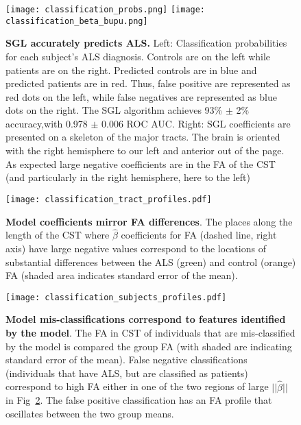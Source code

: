 \begin{figure}[h]
    \centering
    \texttt{[image: classification\_probs.png]}
    \texttt{[image: classification\_beta\_bupu.png]}

    \caption{{\bf SGL accurately predicts ALS.}
        Left: Classification probabilities for each subject's ALS diagnosis.
        Controls are on the left while patients are on the right. Predicted
        controls are in blue and predicted patients are in red. Thus, false
        positive are represented as red dots on the left, while false negatives
        are represented as blue dots on the right. The SGL algorithm achieves
        93\% $\pm$ 2\% accuracy,with 0.978 $\pm$ 0.006 ROC AUC. Right: SGL
        coefficients are presented on a skeleton of the major tracts. The brain
        is oriented with the right hemisphere to our left and anterior out of
        the page. As expected large negative coefficients are in the FA of the
        CST (and particularly in the right hemisphere, here to the left)}
    \label{fig:class-results}
\end{figure}

\begin{figure}[h]
    \centering
    \texttt{[image: classification\_tract\_profiles.pdf]}
    \caption{{\bf Model coefficients mirror FA differences}. The places along the
       length of the CST  where $\hat{\beta}$ coefficients for FA
       (dashed line, right axis) have large negative values correspond to the
       locations of substantial differences between the ALS (green) and control
       (orange) FA (shaded area indicates standard error of the mean).}
    \label{fig:class-profiles}
\end{figure}

\begin{figure}[h]
    \centering
        \texttt{[image: classification\_subjects\_profiles.pdf]}
    \caption{{\bf Model mis-classifications correspond to features identified by
       the model}. The FA in CST of individuals that are mis-classified by the
       model is compared the group FA (with shaded are indicating standard error
       of the mean). False negative classifications (individuals that have ALS,
       but are classified as patients) correspond to high FA either in one of
       the two regions of large $||\hat{\beta}||$ in
       Fig~\ref{fig:class-profiles}. The false positive classification has
       an FA profile that oscillates between the two group means.
   }
    \label{fig:class-errors}
\end{figure}
